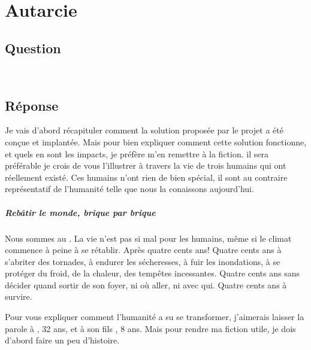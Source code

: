 \chapter{Autarcie}

\section*{Question}

\noindent\colorbox{gray!30}{}\\

\section*{Réponse}

Je vais d'abord récapituler comment la solution proposée par le projet
\nomProjet{} a été conçue et implantée.  Mais pour bien expliquer comment cette
solution fonctionne, et quels en sont les impacts, je préfère m'en remettre à
la fiction.  il sera préférable je crois de vous l'illustrer à travers la vie
de trois humains qui ont réellement existé. Ces humains n'ont rien de bien
spécial, il sont au contraire représentatif de l'humanité telle que nous la
conaissons aujourd'hui.


\paragraph{Rebâtir le monde, brique par brique}

Nous sommes au \siecle. La vie n'est pas si mal pour les humains, même si le
climat commence à peine à se rétablir. Après quatre cents ans! Quatre cents ans à
s'abriter des tornades, à endurer les sécheresses, à fuir les inondations, à se
protéger du froid, de la chaleur, des tempêtes incessantes. Quatre cents ans
sans décider quand sortir de son foyer, ni où aller, ni avec qui.
Quatre cents ans à survire.

Pour vous expliquer comment l'humanité a su se transformer, j'aimerais
laisser la parole à \nomMere{}, 32 ans, et à son fils \nomEnfant{}, 8 ans.
Mais pour rendre ma fiction utile, je dois d'abord faire un peu
d'histoire.  



